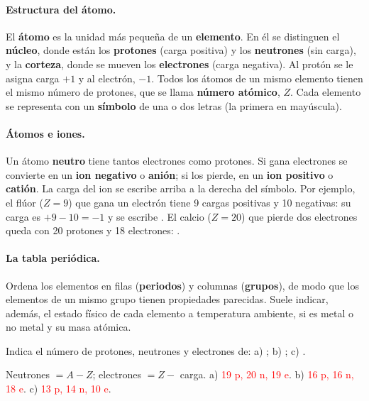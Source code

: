 \paragraph{Estructura del átomo.} El \textbf{átomo} es la unidad más pequeña de un \textbf{elemento}. En él se distinguen el
\textbf{núcleo}, donde están los \textbf{protones} (carga positiva) y los \textbf{neutrones} (sin carga), y la
\textbf{corteza}, donde se mueven los \textbf{electrones} (carga negativa). Al protón se le asigna carga \(+1\) y al electrón,
\(-1\). Todos los átomos de un mismo elemento tienen el mismo número de protones, que se llama \textbf{número atómico}, \(Z\).
Cada elemento se representa con un \textbf{símbolo} de una o dos letras (la primera en mayúscula).

\paragraph{Átomos e iones.} Un átomo \textbf{neutro} tiene tantos electrones como protones. Si gana electrones se convierte en
un \textbf{ion negativo} o \textbf{anión}; si los pierde, en un \textbf{ion positivo} o \textbf{catión}. La carga del ion se
escribe arriba a la derecha del símbolo. Por ejemplo, el flúor (\(Z = 9\)) que gana un electrón tiene 9 cargas positivas y 10
negativas: su carga es \(+9 - 10 = -1\) y se escribe . El calcio (\(Z = 20\)) que pierde dos electrones queda con
20 protones y 18 electrones: .

\paragraph{La tabla periódica.} Ordena los elementos en filas (\textbf{periodos}) y columnas (\textbf{grupos}), de modo que los
elementos de un mismo grupo tienen propiedades parecidas. Suele indicar, además, el estado físico de cada elemento a temperatura
ambiente, si es metal o no metal y su masa atómica.

\begin{exercise}
    Indica el número de protones, neutrones y electrones de: a) ; b) ; c) .
    \begin{solu}
        Neutrones \(= A - Z\); electrones \(= Z -\) carga.
        a) \textcolor{red}{19 p, 20 n, 19 e}. b) \textcolor{red}{16 p, 16 n, 18 e}. c) \textcolor{red}{13 p, 14 n, 10 e}.
    \end{solu}
\end{exercise}

